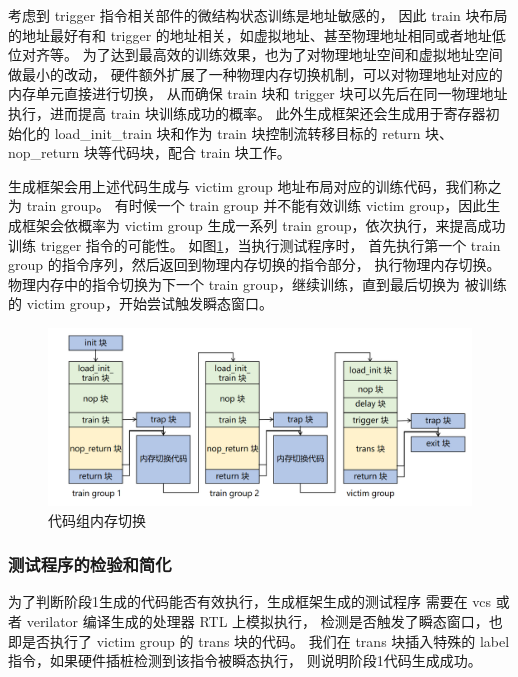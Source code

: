 考虑到 trigger 指令相关部件的微结构状态训练是地址敏感的，
因此 train 块布局的地址最好有和 trigger 的地址相关，如虚拟地址、甚至物理地址相同或者地址低位对齐等。
为了达到最高效的训练效果，也为了对物理地址空间和虚拟地址空间做最小的改动，
硬件额外扩展了一种物理内存切换机制，可以对物理地址对应的内存单元直接进行切换，
从而确保 train 块和 trigger 块可以先后在同一物理地址执行，进而提高 train 块训练成功的概率。
此外生成框架还会生成用于寄存器初始化的 load\_init\_train 块和作为 train 块控制流转移目标的
return 块、nop\_return 块等代码块，配合 train 块工作。\par

生成框架会用上述代码生成与 victim group 地址布局对应的训练代码，我们称之为 train group。
有时候一个 train group 并不能有效训练 victim group，因此生成框架会依概率为 victim group
生成一系列 train group，依次执行，来提高成功训练 trigger 指令的可能性。
如图\ref{paper:memory-switch}，当执行测试程序时，
首先执行第一个 train group 的指令序列，然后返回到物理内存切换的指令部分，
执行物理内存切换。物理内存中的指令切换为下一个 train group，继续训练，直到最后切换为
被训练的 victim group，开始尝试触发瞬态窗口。\par

\begin{figure}[!h]
    \centering
    \includegraphics[width=\linewidth]{figure/paper/group-switch.png}
    \caption{代码组内存切换}
    \label{paper:memory-switch}
\end{figure}

\subsubsection{测试程序的检验和简化}

为了判断阶段1生成的代码能否有效执行，生成框架生成的测试程序
需要在 vcs 或者 verilator 编译生成的处理器 RTL 上模拟执行，
检测是否触发了瞬态窗口，也即是否执行了 victim group 的 trans 块的代码。
我们在 trans 块插入特殊的 label 指令，如果硬件插桩检测到该指令被瞬态执行，
则说明阶段1代码生成成功。\par

